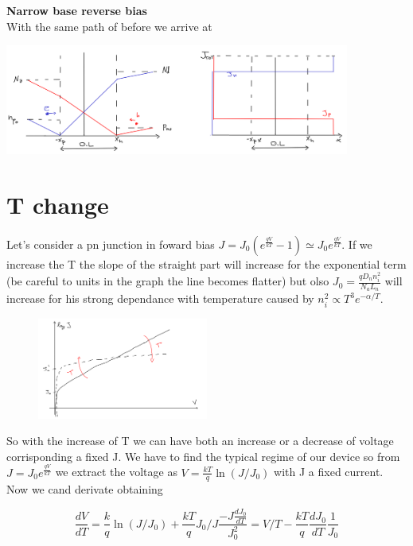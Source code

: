 {\bf Narrow base reverse bias}\\
With the same path of before we arrive at

\centering
\includegraphics[width=0.85\textwidth]{nwall.png}\\
\raggedright

\section{T change}
Let's consider a pn junction in foward bias $J=J_0(e^{\frac{qV}{kT}}-1)\simeq J_0e^{\frac{qV}{kT}}$. If we increase the T the slope of the straight part will increase for the exponential term (be careful to units in the graph the line becomes flatter) but olso $J_0=\frac{qD_nn_i^2}{N_aL_n}$ will increase for his strong dependance with temperature caused by $n_i^2\propto T^3e^{-\alpha/T}$.

\begin{figure}
\includegraphics[width=0.5\textwidth]{JwithT.png}
\end{figure}

So with the increase of T we can have both an increase or a decrease of voltage corrisponding a fixed J. We have to find the typical regime of our device so from $J=J_0e^{\frac{qV}{kT}}$ we extract the voltage as $V=\frac{kT}{q}\ln(J/J_0)$ with J a fixed current. Now we cand derivate obtaining

\begin{equation}
\frac{dV}{dT}= \frac{k}{q}\ln(J/J_0)+\frac{kT}{q}J_0/J \frac{-J \frac{dJ_0}{dT}}{J_0^2}=V/T-\frac{kT}{q}\frac{dJ_0}{dT}\frac{1}{J_0}
\end{equation}

